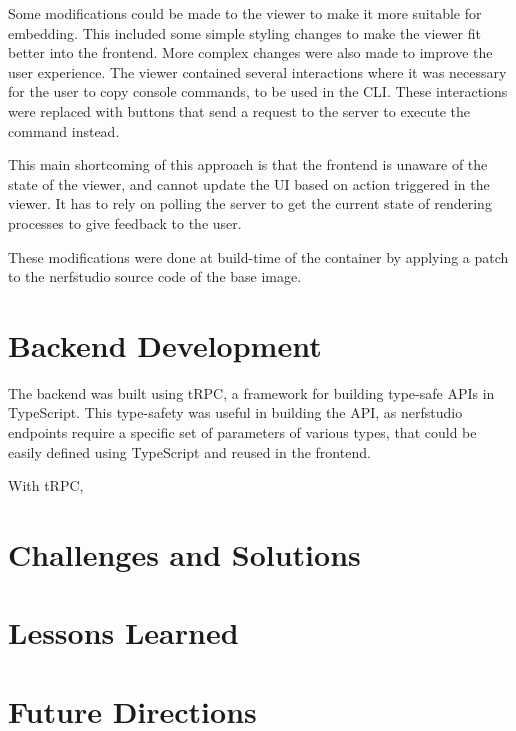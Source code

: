 Some modifications could be made to the viewer to make it more suitable for embedding.
This included some simple styling changes to make the viewer fit better into the frontend.
More complex changes were also made to improve the user experience.
The viewer contained several interactions where it was necessary for the user to copy console commands, to be used in the CLI.
These interactions were replaced with buttons that send a request to the server to execute the command instead.

This main shortcoming of this approach is that the frontend is unaware of the state of the viewer, and cannot update the UI based on action triggered in the viewer. It has to rely on polling the server to get the current state of rendering processes to give feedback to the user.

These modifications were done at build-time of the container by applying a patch to the nerfstudio source code of the base image.


\section{Backend Development}
\label{sec:system:backend}


The backend was built using tRPC, a framework for building type-safe APIs in TypeScript.
This type-safety was useful in building the API, as nerfstudio endpoints require a specific set of parameters of various types, that could be easily defined using TypeScript and reused in the frontend.

With tRPC, 

\section{Challenges and Solutions}
\label{sec:system:challenges}


\section{Lessons Learned}
\label{sec:system:lessons}

\section{Future Directions}
\label{sec:system:future}
